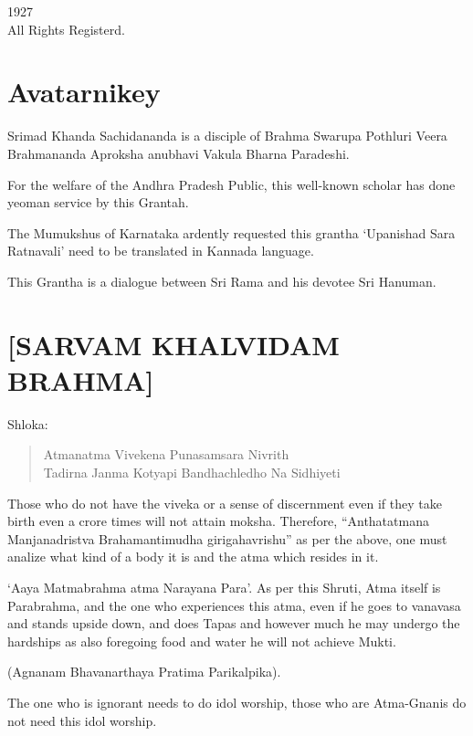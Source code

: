 \begin{center}
1927\\ All Rights Registerd.
\end{center}

\chapter*{Avatarnikey}

Srimad Khanda Sachidananda is a disciple of Brahma Swarupa Pothluri Veera Brahmananda Aproksha anubhavi Vakula Bharna Paradeshi.

For the welfare of the Andhra Pradesh Public, this well-known scholar has done yeoman service by this Grantah.

The Mumukshus of Karnataka ardently requested this grantha ‘Upanishad Sara Ratnavali’ need to be translated in Kannada language.

This Grantha is a dialogue between Sri Rama and his devotee Sri Hanuman.

\chapter*{[SARVAM KHALVIDAM BRAHMA]}

Shloka:

\begin{verse}
 Atmanatma Vivekena Punasamsara Nivrith \\
 Tadirna Janma Kotyapi Bandhachledho Na Sidhiyeti 
\end{verse}

Those who do not have the viveka or a sense of discernment even if they take birth even a crore times will not attain moksha. Therefore, “Anthatatmana Manjanadristva  Brahamantimudha girigahavrishu” as per the above, one must analize what kind of a body it is and the atma which resides in it.

‘Aaya Matmabrahma  atma Narayana Para’. As per this Shruti, Atma itself is Parabrahma, and the one who experiences this atma, even if he goes to vanavasa and stands upside down, and does Tapas and however much he may undergo the hardships as also foregoing food and water he will not achieve Mukti.

\begin{center}
(Agnanam Bhavanarthaya Pratima Parikalpika).
\end{center}

The one who is ignorant needs to do idol worship, those who are Atma-Gnanis do not need this idol worship.


